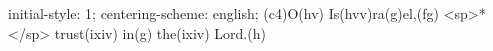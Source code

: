 initial-style: 1;
centering-scheme: english;
(c4)O(hv) Is(hvv)ra(g)el,(fg) <sp>*</sp> trust(ixiv) in(g) the(ixiv) Lord.(h)
